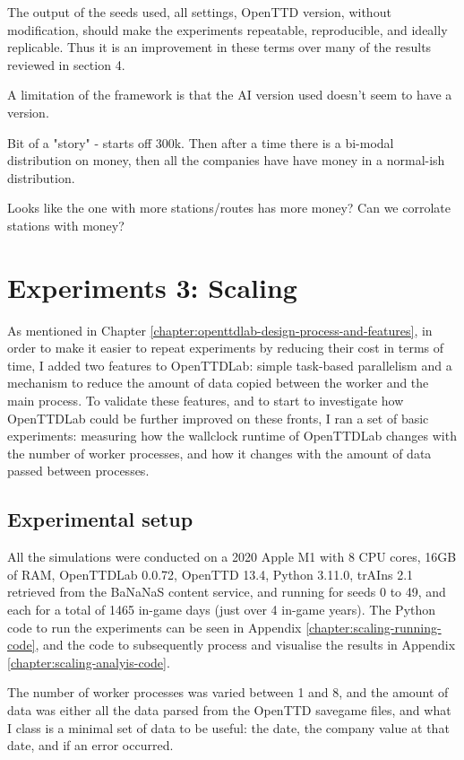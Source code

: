 \documentclass[logo,msc,dsti]{style/infthesis}    %
\begin{document}
{The output of the seeds used, all settings, OpenTTD version, without modification, should make the experiments repeatable, reproducible, and ideally replicable. Thus it is an improvement in these terms over many of the results reviewed in section 4.

A limitation of the framework is that the AI version used doesn't seem to have a version.



Bit of a "story" - starts off 300k. Then after a time there is a bi-modal distribution on money, then all the companies have have money in a normal-ish distribution.

Looks like the one with more stations/routes has more money? Can we corrolate stations with money?




\chapter{Experiments 3: Scaling}
\label{chapter:experiments-scaling}

As mentioned in Chapter \ref{chapter:openttdlab-design-process-and-features}, in order to make it easier to repeat experiments by reducing their cost in terms of time, I added two features to OpenTTDLab: simple task-based parallelism and a mechanism to reduce the amount of data copied between the worker and the main process. To validate these features, and to start to investigate how OpenTTDLab could be further improved on these fronts, I ran a set of basic experiments: measuring how the wallclock runtime of OpenTTDLab changes with the number of worker processes, and how it changes with the amount of data passed between processes.

\section{Experimental setup}

All the simulations were conducted on a 2020 Apple M1 with 8 CPU cores, 16GB of RAM, OpenTTDLab 0.0.72, OpenTTD 13.4, Python 3.11.0, trAIns 2.1 retrieved from the BaNaNaS content service, and running for seeds 0 to 49, and each for a total of 1465 in-game days (just over 4 in-game years). The Python code to run the experiments can be seen in Appendix \ref{chapter:scaling-running-code}, and the code to subsequently process and visualise the results in Appendix \ref{chapter:scaling-analyis-code}.

The number of worker processes was varied between 1 and 8, and the amount of data was either all the data parsed from the OpenTTD savegame files, and what I class is a minimal set of data to be useful: the date, the company value at that date, and if an error occurred.

}
\end{document}
